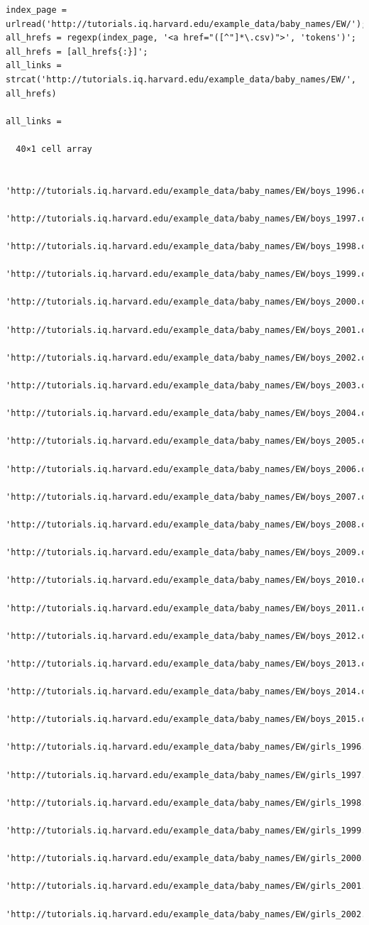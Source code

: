 \documentclass[]{book}
\begin{document}
\begin{verbatim}
index_page = urlread('http://tutorials.iq.harvard.edu/example_data/baby_names/EW/');
all_hrefs = regexp(index_page, '<a href="([^"]*\.csv)">', 'tokens')';
all_hrefs = [all_hrefs{:}]';
all_links = strcat('http://tutorials.iq.harvard.edu/example_data/baby_names/EW/', all_hrefs)

all_links =

  40×1 cell array

    'http://tutorials.iq.harvard.edu/example_data/baby_names/EW/boys_1996.csv'
    'http://tutorials.iq.harvard.edu/example_data/baby_names/EW/boys_1997.csv'
    'http://tutorials.iq.harvard.edu/example_data/baby_names/EW/boys_1998.csv'
    'http://tutorials.iq.harvard.edu/example_data/baby_names/EW/boys_1999.csv'
    'http://tutorials.iq.harvard.edu/example_data/baby_names/EW/boys_2000.csv'
    'http://tutorials.iq.harvard.edu/example_data/baby_names/EW/boys_2001.csv'
    'http://tutorials.iq.harvard.edu/example_data/baby_names/EW/boys_2002.csv'
    'http://tutorials.iq.harvard.edu/example_data/baby_names/EW/boys_2003.csv'
    'http://tutorials.iq.harvard.edu/example_data/baby_names/EW/boys_2004.csv'
    'http://tutorials.iq.harvard.edu/example_data/baby_names/EW/boys_2005.csv'
    'http://tutorials.iq.harvard.edu/example_data/baby_names/EW/boys_2006.csv'
    'http://tutorials.iq.harvard.edu/example_data/baby_names/EW/boys_2007.csv'
    'http://tutorials.iq.harvard.edu/example_data/baby_names/EW/boys_2008.csv'
    'http://tutorials.iq.harvard.edu/example_data/baby_names/EW/boys_2009.csv'
    'http://tutorials.iq.harvard.edu/example_data/baby_names/EW/boys_2010.csv'
    'http://tutorials.iq.harvard.edu/example_data/baby_names/EW/boys_2011.csv'
    'http://tutorials.iq.harvard.edu/example_data/baby_names/EW/boys_2012.csv'
    'http://tutorials.iq.harvard.edu/example_data/baby_names/EW/boys_2013.csv'
    'http://tutorials.iq.harvard.edu/example_data/baby_names/EW/boys_2014.csv'
    'http://tutorials.iq.harvard.edu/example_data/baby_names/EW/boys_2015.csv'
    'http://tutorials.iq.harvard.edu/example_data/baby_names/EW/girls_1996.csv'
    'http://tutorials.iq.harvard.edu/example_data/baby_names/EW/girls_1997.csv'
    'http://tutorials.iq.harvard.edu/example_data/baby_names/EW/girls_1998.csv'
    'http://tutorials.iq.harvard.edu/example_data/baby_names/EW/girls_1999.csv'
    'http://tutorials.iq.harvard.edu/example_data/baby_names/EW/girls_2000.csv'
    'http://tutorials.iq.harvard.edu/example_data/baby_names/EW/girls_2001.csv'
    'http://tutorials.iq.harvard.edu/example_data/baby_names/EW/girls_2002.csv'

\end{verbatim}
\end{document}

